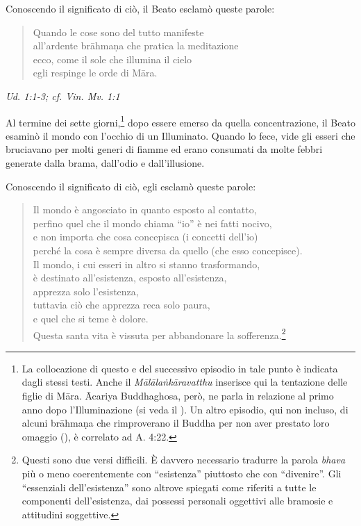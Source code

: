 Conoscendo il significato di ciò, il Beato esclamò queste parole:


\begin{quote}
Quando le cose sono del tutto manifeste \\
all’ardente brāhmaṇa che pratica la meditazione \\
ecco, come il sole che illumina il cielo \\
egli respinge le orde di Māra.
\end{quote}

\emph{Ud. 1:1-3; cf. Vin. Mv. 1:1}


Al termine dei sette giorni,\footnote{La collocazione di questo e del successivo episodio in tale punto è indicata dagli stessi testi. Anche il \emph{Mālālaṅkāravatthu} inserisce qui la tentazione delle figlie di Māra. Ācariya Buddhaghosa, però, ne parla in relazione al primo anno dopo l’Illuminazione (si veda il \hyperlink{cap-04-La-diffusione-del-Dhamma#pag70}{}). Un altro episodio, qui non incluso, di alcuni brāhmaṇa che rimproverano il Buddha per non aver prestato loro omaggio (\hyperlink{cap-09-La-fine-del-primo-ventennio#pag137}{}), è correlato ad A. 4:22.} dopo essere emerso da
quella concentrazione, il Beato esaminò il mondo con l’occhio di un
Illuminato. Quando lo fece, vide gli esseri che bruciavano per molti
generi di fiamme ed erano consumati da molte febbri generate dalla
brama, dall’odio e dall’illusione.


Conoscendo il significato di ciò, egli esclamò queste parole:


\begin{quote}
Il mondo è angosciato in quanto esposto al contatto, \\
perfino quel che il mondo chiama “io” è nei fatti nocivo, \\
e non importa che cosa concepisca (i concetti dell’io) \\
perché la cosa è sempre diversa da quello (che esso concepisce). \\
Il mondo, i cui esseri in altro si stanno trasformando, \\
è destinato all’esistenza, esposto all’esistenza, \\
apprezza solo l’esistenza, \\
tuttavia ciò che apprezza reca solo paura, \\
e quel che si teme è dolore. \\
Questa santa vita è vissuta per abbandonare la
sofferenza.\footnote{Questi sono due versi difficili. È davvero necessario tradurre la parola \emph{bhava} più o meno coerentemente con “esistenza” piuttosto che con “divenire”. Gli “essenziali dell’esistenza” sono altrove spiegati come riferiti a tutte le componenti dell’esistenza, dai possessi personali oggettivi alle bramosie e attitudini soggettive.}
\end{quote}

